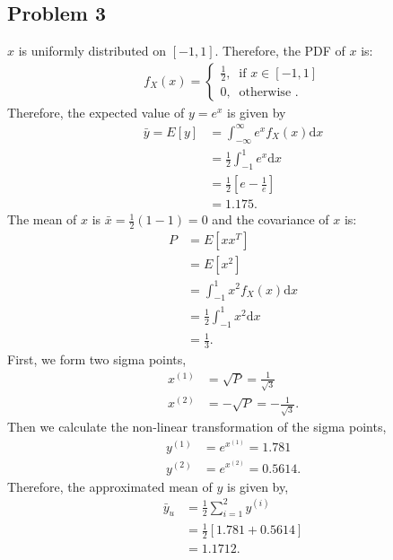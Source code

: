\subsection*{Problem 3}
$x$ is uniformly distributed on $[-1,1]$. Therefore, the PDF of $x$ is:
\begin{align*}
	f_X(x) = \begin{cases}
		\frac{1}{2},\ \text{ if } x \in [-1,1]\\
		0,\ \text{ otherwise }.
	\end{cases}
\end{align*}
Therefore, the expected value of $y=e^x$ is given by
\begin{align*}
	\bar{y} = E[y] &= \int_{-\infty}^{\infty} e^x f_X(x)\text{d}x\\
	&= \frac{1}{2}\int_{-1}^{1} e^x \text{d}x\\
	&= \frac{1}{2}\left[e-\frac{1}{e}\right]\\
	&= 1.175.
\end{align*}
The mean of $x$ is $\bar{x} = \frac{1}{2}(1-1) = 0$ and the covariance of $x$ is:
\begin{align*}
	P &= E[xx^T]\\
	&= E[x^2]\\
	&= \int_{-1}^{1} x^2 f_X(x)\text{d}x\\
	&= \frac{1}{2} \int_{-1}^{1} x^2\text{d}x\\
	&= \frac{1}{3}.
\end{align*}
First, we form two sigma points,
\begin{align*}
	x^{(1)} &= \sqrt{P} = \frac{1}{\sqrt{3}}\\
	x^{(2)} &= -\sqrt{P} = -\frac{1}{\sqrt{3}}.
\end{align*}
Then we calculate the non-linear transformation of the sigma points,
\begin{align*}
	y^{(1)} &= e^{x^{(1)}} = 1.781\\
	y^{(2)} &= e^{x^{(2)}} = 0.5614.
\end{align*}
Therefore, the approximated mean of $y$ is given by,
\begin{align*}
	\bar{y}_u &= \frac{1}{2}\sum_{i=1}^{2}y^{(i)}\\
	&= \frac{1}{2}[1.781+0.5614]\\
	&= 1.1712.
\end{align*}